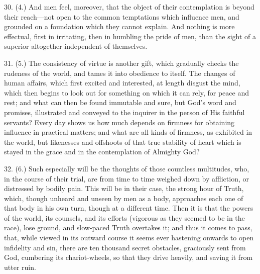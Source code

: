 30. (4.) And men feel, moreover, that the object of their
contemplation is beyond their reach—not open to the common
temptations which influence men, and grounded on a foundation which
they cannot explain. And nothing is more effectual, first in
irritating, then in humbling the pride of men, than the sight of a
superior altogether independent of themselves.

31. (5.) The consistency of virtue is another gift, which gradually
checks the rudeness of the world, and tames it into obedience to
itself. The changes of human affairs, which first excited and
interested, at length disgust the mind, which then begins to look out
for something on which it can rely, for peace and rest; and what can
then be found immutable and sure, but God's word and promises,
illustrated and conveyed to the inquirer in the person of His faithful
servants? Every day shows us how much depends on firmness for
obtaining influence in practical matters; and what are all kinds of
firmness, as exhibited in the world, but likenesses and offshoots of
that true stability of heart which is stayed in the grace and in the
contemplation of Almighty God?

32. (6.) Such especially will be the thoughts of those countless
multitudes, who, in the course of their trial, are from time to time
weighed down by affliction, or distressed by bodily pain. This will be
in their case, the strong hour of Truth, which, though unheard and
unseen by men as a body, approaches each one of that body in his own
turn, though at a different time. Then it is that the powers of the
world, its counsels, and its efforts (vigorous as they seemed to be in
the race), lose ground, and slow-paced Truth overtakes it; and thus it
comes to pass, that, while viewed in its outward course it seems ever
hastening onwards to open infidelity and sin, there are ten thousand
secret obstacles, graciously sent from God, cumbering its
chariot-wheels, so that they drive heavily, and saving it from utter
ruin.


